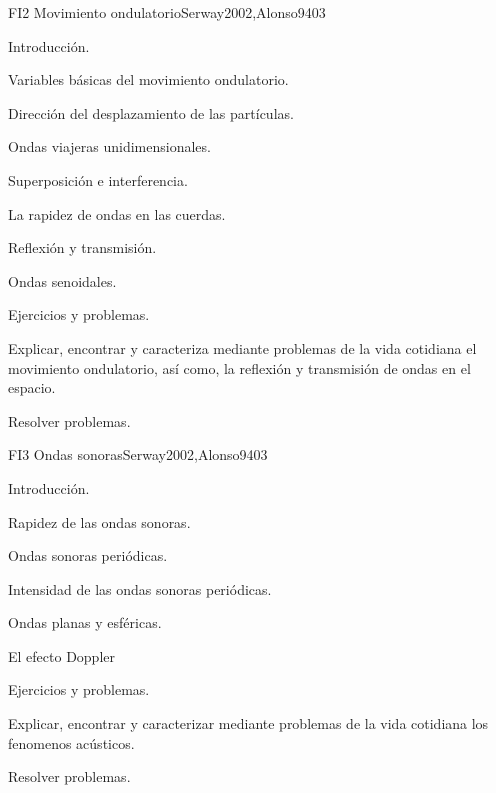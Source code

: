 \begin{syllabus}
\begin{unit}{FI2 Movimiento ondulatorio}{Serway2002,Alonso94}{0}{3}
\begin{topics}
      \item Introducción.
        \item Variables básicas del movimiento ondulatorio.
        \item Dirección del desplazamiento de las partículas.
        \item Ondas viajeras unidimensionales.
        \item Superposición e interferencia.
        \item La rapidez de ondas en las cuerdas.
        \item Reflexión y transmisión.
        \item Ondas senoidales.
        \item Ejercicios y problemas.
   \end{topics}
   \begin{learningoutcomes}
      \item Explicar, encontrar y caracteriza mediante problemas de la vida cotidiana el movimiento ondulatorio, así como, la reflexión y transmisión de ondas en el espacio.
      \item Resolver problemas.
   \end{learningoutcomes}
\end{unit}

\begin{unit}{FI3 Ondas sonoras}{Serway2002,Alonso94}{0}{3}
\begin{topics}
      \item  Introducción.
        \item Rapidez de las ondas sonoras.
        \item Ondas sonoras periódicas.
        \item Intensidad de las ondas sonoras periódicas.
        \item Ondas planas y esféricas.
        \item El efecto Doppler
        \item Ejercicios y problemas.
   \end{topics}
   \begin{learningoutcomes}
      \item Explicar, encontrar y caracterizar mediante problemas de la vida cotidiana los fenomenos acústicos.
      \item Resolver problemas.
   \end{learningoutcomes}
\end{unit}


\end{syllabus}
